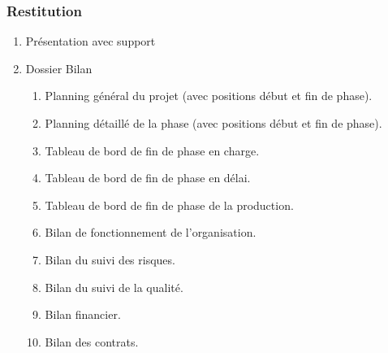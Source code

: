 \documentclass[twoside]{article}
\begin{document}
\subsubsection{Restitution}
		\begin{enumerate}
			\item Présentation avec support 
			\item Dossier Bilan
				\begin{enumerate}
					\item Planning général du projet
                        (avec positions début et fin de phase).
					\item Planning détaillé de la phase
                        (avec positions début et fin de phase).
					\item Tableau de bord de fin de phase en charge.
					\item Tableau de bord de fin de phase en délai.
					\item Tableau de bord de fin de phase de la production.
					\item Bilan de fonctionnement de l'organisation.
					\item Bilan du suivi des risques.
					\item Bilan du suivi de la qualité.
					\item Bilan financier.
					\item Bilan des contrats.
				\end{enumerate}
		\end{enumerate}
				

\end{document}
